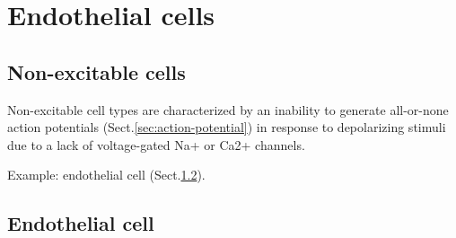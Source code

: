 \chapter{Endothelial cells}

\section{Non-excitable cells}
\label{sec:non-excitable-cells}

Non-excitable cell types are characterized by an inability to generate
all-or-none action potentials (Sect.\ref{sec:action-potential}) in response to
depolarizing stimuli due to a lack of voltage-gated Na+ or Ca2+ channels. 

Example: endothelial cell (Sect.\ref{sec:endothelial-cell}).


\section{Endothelial cell}
\label{sec:endothelial-cell}
